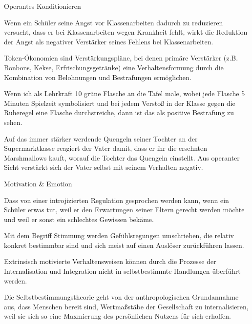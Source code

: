 \begin{multiple-choice}{Operantes Konditionieren}
    \begin{answers}
        \item[\unsure] Wenn ein Schüler seine Angst vor Klassenarbeiten dadurch zu reduzieren versucht, dass er bei Klassenarbeiten wegen Krankheit fehlt, wirkt die Reduktion der Angst als negativer Verstärker seines Fehlens bei Klassenarbeiten.
        \item[\correct] Token-Ökonomien sind Verstärkungspläne, bei denen primäre Verstärker (z.B. Bonbons, Kekse, Erfrischungsgetränke) eine Verhaltensformung durch die Kombination von Belohnungen und Bestrafungen ermöglichen.
        \item[\correct] Wenn ich als Lehrkraft 10 grüne Flasche an die Tafel male, wobei jede Flasche 5 Minuten Spielzeit symbolisiert und bei jedem Verstoß in der Klasse gegen die Ruheregel eine Flasche durchstreiche, dann ist das als positive Bestrafung zu sehen.
        \item[\wrong] Auf das immer stärker werdende Quengeln seiner Tochter an der Supermarktkasse reagiert der Vater damit, dass er ihr die ersehnten Marshmallows kauft, worauf die Tochter das Quengeln einstellt. Aus operanter Sicht verstärkt sich der Vater selbst mit seinem Verhalten negativ.
    \end{answers}
\end{multiple-choice}

\begin{multiple-choice}{Motivation \& Emotion}
    \begin{answers}
        \item[\correct] Dass von einer introjizierten Regulation gesprochen werden kann, wenn ein Schüler etwas tut, weil er den Erwartungen seiner Eltern gerecht werden möchte und weil er sonst ein schlechtes Gewissen bekäme.
        \item[\wrong] Mit dem Begriff Stimmung werden Gefühlsregungen umschrieben, die relativ konkret bestimmbar sind und sich meist auf einen Auslöser zurückführen lassen.
        \item[\wrong] Extrinsisch motivierte Verhaltensweisen können durch die Prozesse der Internalisation und Integration nicht in selbstbestimmte Handlungen überführt werden.
        \item[\wrong] Die Selbstbestimmungstheorie geht von der anthropologischen Grundannahme aus, dass Menschen bereit sind, Wertmaßstäbe der Gesellschaft zu internalisieren, weil sie sich so eine Maxmierung des persönlichen Nutzens für sich erhoffen. 
    \end{answers}
\end{multiple-choice}

